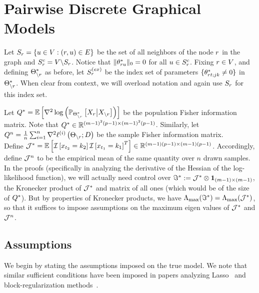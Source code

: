 \section{Pairwise Discrete Graphical Models}

Let $S_{r}= \{u \in V : (r,u) \in E\}$ be the set of all neighbors of the node $r$ in the graph and $S^c_{r} = V \backslash S_{r}$. Notice that $\|\theta^*_{r u}\|_0 = 0$ for all $u \in S^c_{r}$. Fixing $r\in V$, and defining $\Theta^*_{\backslash r}$ as before, let $S^{(ex)}_{r}$ be the index set of parameters $\{\theta^*_{r t;jk} \neq 0 \}$ in $\Theta^*_{\backslash r}$. When clear from context, we will overload notation and again use $S_{r}$ for this index set.

\noindent Let $Q^* = \mathbb{E} \left[ \nabla^2 \log\left(\mathbb{P}_{\Theta^*_{\backslash r}} \left[X_{r}\big|X_{\backslash r}\right] \right)\right]$ be the population Fisher information matrix. Note that $Q^* \in \mathbb{R}^{(m-1)^2 (p-1) \times (m-1)^2 (p-1)}$. Similarly, let $Q^n=\frac{1}{n}\sum_{i=1}^n\nabla^2\ell^{(i)}\left(\Theta_{\backslash r}; D\right)$ be the sample Fisher information matrix.\\

\noindent Define $\mathcal{J}^*=\mathbb{E}\left[\mathcal{I}\left[x_{t_2}=k_2\right] \mathcal{I}\left[x_{t_1}=k_1\right]^T\right] \in \mathbb{R}^{(m-1)(p-1)\times(m-1)(p-1)}$. Accordingly, define $\mathcal{J}^n$ to be the empirical mean of the same quantity over $n$ drawn samples. In the proofs (specifically in analyzing the derivative of the Hessian of the log-likelihood function), we will actually need control over $\Im^* := \mathcal{J}^*\otimes\mathbf{1}_{(m-1)\times (m-1)}$, the Kronecker product of $\mathcal{J}^*$ and matrix of all ones (which would be of the size of $Q^*$). But by properties of Kronecker products, we have $\Lambda_{\max}(\Im^*)=\Lambda_{\max}(\mathcal{J}^*)$, so that it suffices to impose assumptions on the maximum eigen values of $\mathcal{J}^*$ and $\mathcal{J}^n$.\\

\subsection{Assumptions}

We begin by stating the assumptions imposed on the true model. We note that similar sufficient conditions have been imposed in papers analyzing Lasso~\citep{WainwrightLasso} and block-regularization methods~\cite{NWJoint,Obozinski10}.


